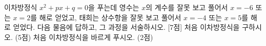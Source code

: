 이차방정식 $x^2+px+q=0$을 푸는데 영수는 $x$의 계수를 잘못 보고 풀어서 $x=-6$ 또는 $x=2$를 해로 얻었고, 태희는 상수항을 잘못 보고 풀어서 $x=-4$ 또는 $x=5$를 해로 얻었다. 다음 물음에 답하고, 그 과정을 서술하시오. \mbox{[7점]}
 처음 이차방정식을 구하시오. (5점)
 처음 이차방정식을 바르게 푸시오. (2점)
